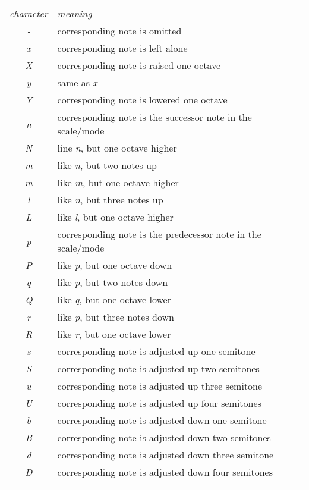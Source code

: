 \documentclass{article}
\begin{document}
\begin{tabular}{cl}%
\T\toprule
{\it character} & {\it meaning} \\
\T\midrule
{\it -}      & corresponding note is omitted \\
{\it x}      & corresponding note is left alone \\
{\it X}      & corresponding note is raised one octave \\
{\it y}      & same as {\it x} \\
{\it Y}      & corresponding note is lowered one octave \\
{\it n}      & corresponding note is the successor note in the scale/mode \\
{\it N}      & line {\it n}, but one octave higher \\
{\it m}      & like {\it n}, but two notes up \\
{\it m}      & like {\it m}, but one octave higher \\
{\it l}      & like {\it n}, but three notes up \\
{\it L}      & like {\it l}, but one octave higher \\
{\it p}      & corresponding note is the predecessor note in the scale/mode \\
{\it P}      & like {\it p}, but one octave down \\
{\it q}      & like {\it p}, but two notes down \\
{\it Q}      & like {\it q}, but one octave lower \\
{\it r}      & like {\it p}, but three notes down \\
{\it R}      & like {\it r}, but one octave lower \\
{\it s}      & corresponding note is adjusted up one semitone \\
{\it S}      & corresponding note is adjusted up two semitones \\
{\it u}      & corresponding note is adjusted up three semitone \\
{\it U}      & corresponding note is adjusted up four semitones \\
{\it b}      & corresponding note is adjusted down one semitone \\
{\it B}      & corresponding note is adjusted down two semitones \\
{\it d}      & corresponding note is adjusted down three semitone \\
{\it D}      & corresponding note is adjusted down four semitones \\
\T\bottomrule
\end{tabular}
\end{document}
